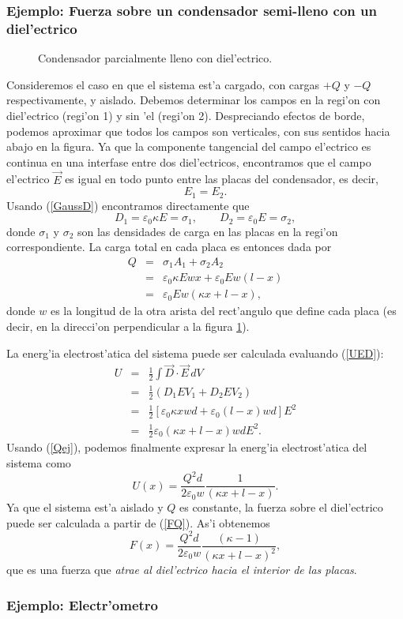 \subsubsection{Ejemplo: Fuerza sobre un condensador semi-lleno con un
diel'ectrico}
\begin{figure}[!h]
\centerline{}
\caption{Condensador parcialmente lleno con diel'ectrico.}
\label{fig:fccd}
\end{figure}
Consideremos el caso en que el sistema est'a cargado, con cargas $+Q$ y $-Q$
respectivamente, y aislado. Debemos determinar los campos en la regi'on con
diel'ectrico (regi'on 1) y sin 'el (regi'on 2). Despreciando efectos de borde,
podemos aproximar que todos los campos son verticales, con sus sentidos hacia
abajo en la figura. Ya que la componente tangencial del campo el'ectrico es
continua en una interfase entre dos diel'ectricos, encontramos que el campo
el'ectrico $\vec{E}$ es igual en todo punto entre las placas del condensador,
es decir,
\begin{equation}
 E_1=E_2.
\end{equation}
Usando (\ref{GaussD}) encontramos directamente que
\begin{equation}
 D_1=\varepsilon_0\kappa E=\sigma_1, \qquad D_2=\varepsilon_0 E=\sigma_2,
\end{equation}
donde $\sigma_1$ y $\sigma_2$ son las densidades de carga en las placas en la
regi'on correspondiente. La carga total en cada placa es entonces dada por
\begin{eqnarray}
 Q&=&\sigma_1A_1+\sigma_2A_2 \\
&=& \varepsilon_0\kappa E w x+\varepsilon_0E w (l-x) \\
&=& \varepsilon_0Ew\left(\kappa x+l-x\right), \label{Qej}
\end{eqnarray}
donde $w$ es la longitud de la otra arista del rect'angulo que define cada placa (es decir, en la direcci'on perpendicular a la figura \ref{fig:fccd}).

La energ'ia electrost'atica del sistema puede ser calculada evaluando
(\ref{UED}):
\begin{eqnarray}
 U&=&\frac{1}{2}\int\vec{D}\cdot\vec{E}\,dV \\
&=&\frac{1}{2}\left(D_1EV_1+D_2EV_2\right) \\
&=&\frac{1}{2}\left[\varepsilon_0\kappa
xwd+\varepsilon_0(l-x)wd\right]E^2 \\
&=&\frac{1}{2}\varepsilon_0\left(\kappa x+l-x\right)wdE^2 .
\end{eqnarray}
Usando (\ref{Qej}), podemos finalmente expresar la energ'ia electrost'atica
del sistema como
\begin{equation}
U(x)=\frac{Q^2d}{2\varepsilon_0 w}\frac{1}{(\kappa x+l-x)}.
\end{equation}
Ya que el sistema est'a aislado y $Q$ es constante, la fuerza sobre el
diel'ectrico puede ser calculada a partir de (\ref{FQ}). As'i obtenemos
\begin{equation}
 F(x)=\frac{Q^2d}{2\varepsilon_0 w}\frac{(\kappa-1)}{(\kappa x+l-x)^2},
\end{equation}
que es una fuerza que \textit{atrae al diel'ectrico hacia el interior de las
placas}.

\subsubsection{Ejemplo: Electr'ometro}